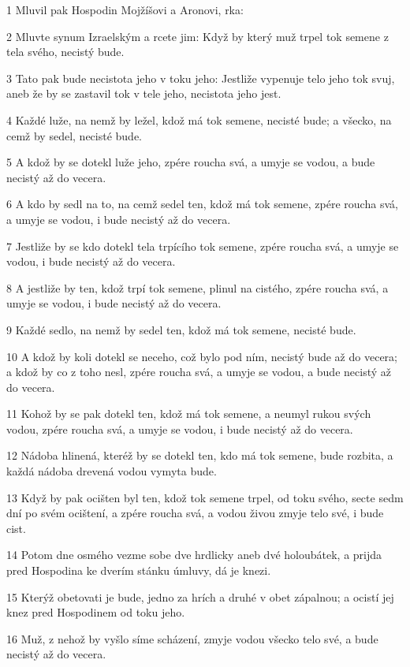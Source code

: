 \par 1 Mluvil pak Hospodin Mojžíšovi a Aronovi, rka:
\par 2 Mluvte synum Izraelským a rcete jim: Když by který muž trpel tok semene z tela svého, necistý bude.
\par 3 Tato pak bude necistota jeho v toku jeho: Jestliže vypenuje telo jeho tok svuj, aneb že by se zastavil tok v tele jeho, necistota jeho jest.
\par 4 Každé luže, na nemž by ležel, kdož má tok semene, necisté bude; a všecko, na cemž by sedel, necisté bude.
\par 5 A kdož by se dotekl luže jeho, zpére roucha svá, a umyje se vodou, a bude necistý až do vecera.
\par 6 A kdo by sedl na to, na cemž sedel ten, kdož má tok semene, zpére roucha svá, a umyje se vodou, i bude necistý až do vecera.
\par 7 Jestliže by se kdo dotekl tela trpícího tok semene, zpére roucha svá, a umyje se vodou, i bude necistý až do vecera.
\par 8 A jestliže by ten, kdož trpí tok semene, plinul na cistého, zpére roucha svá, a umyje se vodou, i bude necistý až do vecera.
\par 9 Každé sedlo, na nemž by sedel ten, kdož má tok semene, necisté bude.
\par 10 A kdož by koli dotekl se neceho, což bylo pod ním, necistý bude až do vecera; a kdož by co z toho nesl, zpére roucha svá, a umyje se vodou, a bude necistý až do vecera.
\par 11 Kohož by se pak dotekl ten, kdož má tok semene, a neumyl rukou svých vodou, zpére roucha svá, a umyje se vodou, i bude necistý až do vecera.
\par 12 Nádoba hlinená, kteréž by se dotekl ten, kdo má tok semene, bude rozbita, a každá nádoba drevená vodou vymyta bude.
\par 13 Když by pak ocišten byl ten, kdož tok semene trpel, od toku svého, secte sedm dní po svém ocištení, a zpére roucha svá, a vodou živou zmyje telo své, i bude cist.
\par 14 Potom dne osmého vezme sobe dve hrdlicky aneb dvé holoubátek, a prijda pred Hospodina ke dverím stánku úmluvy, dá je knezi.
\par 15 Kterýž obetovati je bude, jedno za hrích a druhé v obet zápalnou; a ocistí jej knez pred Hospodinem od toku jeho.
\par 16 Muž, z nehož by vyšlo síme scházení, zmyje vodou všecko telo své, a bude necistý až do vecera.
